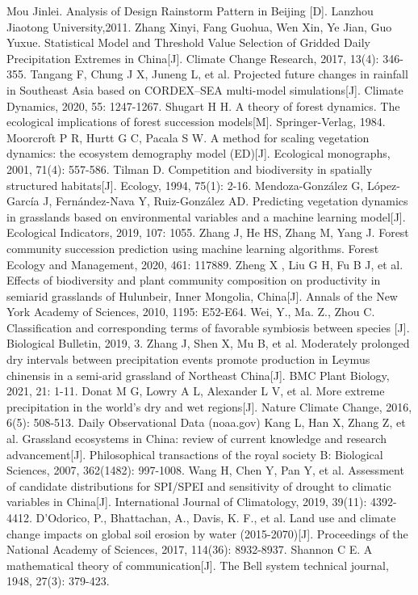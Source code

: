 \documentclass{mcmthesis}
\begin{document}
\clearpage
{}
{}
\begin{thebibliography}{99}
	Mou Jinlei. Analysis of Design Rainstorm Pattern in Beijing [D]. Lanzhou Jiaotong University,2011.
	Zhang Xinyi, Fang Guohua, Wen Xin, Ye Jian, Guo Yuxue. Statistical Model and Threshold Value Selection of Gridded Daily Precipitation Extremes in China[J]. Climate Change Research, 2017, 13(4): 346-355.
	Tangang F, Chung J X, Juneng L, et al. Projected future changes in rainfall in Southeast Asia based on CORDEX–SEA multi-model simulations[J]. Climate Dynamics, 2020, 55: 1247-1267.
	 Shugart H H. A theory of forest dynamics. The ecological implications of forest succession models[M]. Springer-Verlag, 1984.
	Moorcroft P R, Hurtt G C, Pacala S W. A method for scaling vegetation dynamics: the ecosystem demography model (ED)[J]. Ecological monographs, 2001, 71(4): 557-586.
	Tilman D. Competition and biodiversity in spatially structured habitats[J]. Ecology, 1994, 75(1): 2-16.
	Mendoza-González G, López-García J, Fernández-Nava Y, Ruiz-González AD. Predicting vegetation dynamics in grasslands based on environmental variables and a machine learning model[J]. Ecological Indicators, 2019, 107: 1055.
	Zhang J, He HS, Zhang M, Yang J. Forest community succession prediction using machine learning algorithms. Forest Ecology and Management, 2020, 461: 117889.
	Zheng X , Liu G H, Fu B J, et al. Effects of biodiversity and plant community composition on productivity in semiarid grasslands of Hulunbeir, Inner Mongolia, China[J]. Annals of the New York Academy of Sciences, 2010, 1195: E52-E64.
	Wei, Y., Ma. Z., Zhou C. Classification and corresponding terms of favorable symbiosis between species [J]. Biological Bulletin, 2019, 3.
	Zhang J, Shen X, Mu B, et al. Moderately prolonged dry intervals between precipitation events promote production in Leymus chinensis in a semi-arid grassland of Northeast China[J]. BMC Plant Biology, 2021, 21: 1-11.
	Donat M G, Lowry A L, Alexander L V, et al. More extreme precipitation in the world’s dry and wet regions[J]. Nature Climate Change, 2016, 6(5): 508-513.
	Daily Observational Data (noaa.gov)
	Kang L, Han X, Zhang Z, et al. Grassland ecosystems in China: review of current knowledge and research advancement[J]. Philosophical transactions of the royal society B: Biological Sciences, 2007, 362(1482): 997-1008.
	Wang H, Chen Y, Pan Y, et al. Assessment of candidate distributions for SPI/SPEI and sensitivity of drought to climatic variables in China[J]. International Journal of Climatology, 2019, 39(11): 4392-4412.
	D'Odorico, P., Bhattachan, A., Davis, K. F., et al. Land use and climate change impacts on global soil erosion by water (2015-2070)[J]. Proceedings of the National Academy of Sciences, 2017, 114(36): 8932-8937.
	Shannon C E. A mathematical theory of communication[J]. The Bell system technical journal, 1948, 27(3): 379-423.
\end{thebibliography}
\end{document}
